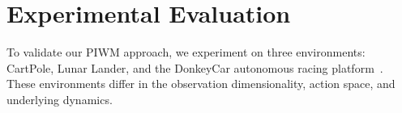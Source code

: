 \documentclass[nonacm,sigconf]{acmart}
\begin{document}







\section{Experimental Evaluation}\label{sec:experiments}
To validate our PIWM approach, we experiment on three environments: CartPole, Lunar Lander, and the DonkeyCar autonomous racing platform~\cite[]{brockman2016openai,viitala2021learning}. These environments differ in the observation dimensionality, action space, and underlying dynamics.

\end{document}
